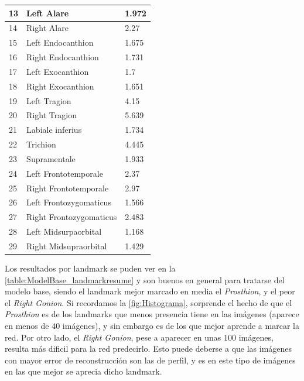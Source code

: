 \begin{table}[!ht]
\begin{tabular}{|l|l|l|}
                13 & Left Alare & 1.972 \\ \hline
                14 & Right Alare & 2.27 \\ \hline
                15 & Left Endocanthion & 1.675 \\ \hline
                16 & Right Endocanthion & 1.731 \\ \hline
                17 & Left Exocanthion & 1.7 \\ \hline
                18 & Right Exocanthion & 1.651 \\ \hline
                19 & Left Tragion & 4.15 \\ \hline
                20 & Right Tragion & 5.639 \\ \hline
                21 & Labiale inferius & 1.734 \\ \hline
                22 & Trichion & 4.445 \\ \hline
                23 & Supramentale & 1.933 \\ \hline
                24 & Left Frontotemporale & 2.37 \\ \hline
                25 & Right Frontotemporale & 2.97 \\ \hline
                26 & Left Frontozygomaticus & 1.566 \\ \hline
                27 & Right Frontozygomaticus & 2.483 \\ \hline
                28 & Left Midsurpaorbital & 1.168 \\ \hline
                29 & Right Midsupraorbital & 1.429 \\ \hline
            \end{tabular}
            \label{table:ModelBase_landmarkresume}
        \end{table}
        \medskip

        \noindent Los resultados por landmark se puden ver en la \autoref{table:ModelBase_landmarkresume} y son buenos en general para tratarse del modelo base, siendo el landmark mejor marcado en media el \textit{Prosthion}, y el peor el \textit{Right Gonion}. Si recordamos la \autoref{fig:Histograma}, sorprende el hecho de que el \textit{Prosthion} es de los landmarks que menos presencia tiene en las imágenes (aparece en menos de $40$ imágenes), y sin embargo es de los que mejor aprende a marcar la red. Por otro lado, el \textit{Right Gonion}, pese a aparecer en unas $100$ imágenes, resulta más dificil para la red predecirlo. Esto puede deberse a que las imágenes con mayor error de reconstrucción son las de perfil, y es en este tipo de imágenes en las que mejor se aprecia dicho landmark.

